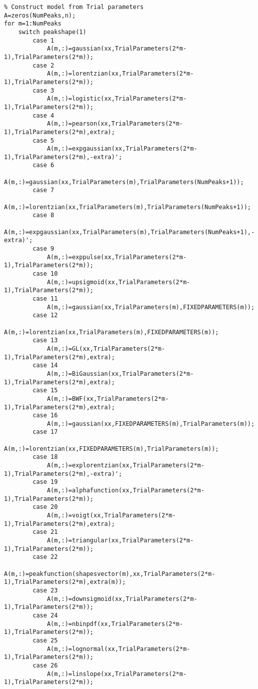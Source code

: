 \begin{lstlisting}
% Construct model from Trial parameters
A=zeros(NumPeaks,n);
for m=1:NumPeaks
    switch peakshape(1)
        case 1
            A(m,:)=gaussian(xx,TrialParameters(2*m-1),TrialParameters(2*m));
        case 2
            A(m,:)=lorentzian(xx,TrialParameters(2*m-1),TrialParameters(2*m));
        case 3
            A(m,:)=logistic(xx,TrialParameters(2*m-1),TrialParameters(2*m));
        case 4
            A(m,:)=pearson(xx,TrialParameters(2*m-1),TrialParameters(2*m),extra);
        case 5
            A(m,:)=expgaussian(xx,TrialParameters(2*m-1),TrialParameters(2*m),-extra)';
        case 6
            A(m,:)=gaussian(xx,TrialParameters(m),TrialParameters(NumPeaks+1));
        case 7
            A(m,:)=lorentzian(xx,TrialParameters(m),TrialParameters(NumPeaks+1));
        case 8
            A(m,:)=expgaussian(xx,TrialParameters(m),TrialParameters(NumPeaks+1),-extra)';
        case 9
            A(m,:)=exppulse(xx,TrialParameters(2*m-1),TrialParameters(2*m));
        case 10
            A(m,:)=upsigmoid(xx,TrialParameters(2*m-1),TrialParameters(2*m));
        case 11
            A(m,:)=gaussian(xx,TrialParameters(m),FIXEDPARAMETERS(m));
        case 12
            A(m,:)=lorentzian(xx,TrialParameters(m),FIXEDPARAMETERS(m));
        case 13
            A(m,:)=GL(xx,TrialParameters(2*m-1),TrialParameters(2*m),extra);
        case 14
            A(m,:)=BiGaussian(xx,TrialParameters(2*m-1),TrialParameters(2*m),extra);
        case 15
            A(m,:)=BWF(xx,TrialParameters(2*m-1),TrialParameters(2*m),extra);        
        case 16
            A(m,:)=gaussian(xx,FIXEDPARAMETERS(m),TrialParameters(m));
        case 17
            A(m,:)=lorentzian(xx,FIXEDPARAMETERS(m),TrialParameters(m));
        case 18
            A(m,:)=explorentzian(xx,TrialParameters(2*m-1),TrialParameters(2*m),-extra)';
        case 19
            A(m,:)=alphafunction(xx,TrialParameters(2*m-1),TrialParameters(2*m));
        case 20
            A(m,:)=voigt(xx,TrialParameters(2*m-1),TrialParameters(2*m),extra);        
        case 21
            A(m,:)=triangular(xx,TrialParameters(2*m-1),TrialParameters(2*m));
        case 22
            A(m,:)=peakfunction(shapesvector(m),xx,TrialParameters(2*m-1),TrialParameters(2*m),extra(m));        
        case 23
            A(m,:)=downsigmoid(xx,TrialParameters(2*m-1),TrialParameters(2*m));        
        case 24
            A(m,:)=nbinpdf(xx,TrialParameters(2*m-1),TrialParameters(2*m));
        case 25
            A(m,:)=lognormal(xx,TrialParameters(2*m-1),TrialParameters(2*m));
        case 26
            A(m,:)=linslope(xx,TrialParameters(2*m-1),TrialParameters(2*m));

\end{lstlisting}
